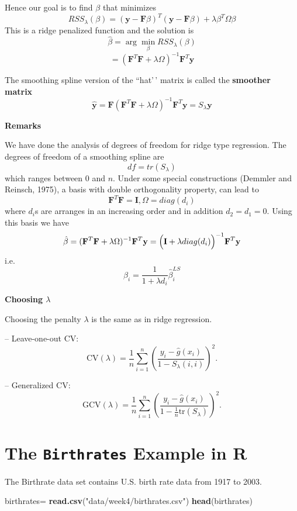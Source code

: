 \documentclass[
]{book}
\newenvironment{Shaded}{\begin{snugshade}}{\end{snugshade}}
\newcommand{\FunctionTok}[1]{\textcolor[rgb]{0.13,0.29,0.53}{\textbf{#1}}}
\newcommand{\NormalTok}[1]{#1}
\newcommand{\OtherTok}[1]{\textcolor[rgb]{0.56,0.35,0.01}{#1}}
\newcommand{\StringTok}[1]{\textcolor[rgb]{0.31,0.60,0.02}{#1}}
\begin{document}
Hence our goal is to find \(\beta\) that minimizes
\[RSS_{\lambda}(\beta) = (\mathbf{y} - \mathbf{F}\beta)^T(\mathbf{y} - \mathbf{F}\beta) + \lambda  \beta^T \Omega \beta \]
This is a ridge penalized function and the solution is
\[\hat{\beta} = \arg \min_{\beta} RSS_{\lambda}(\beta)\]
\[=(\mathbf{F}^T \mathbf{F} +\lambda \Omega)^{-1} \mathbf{F}^T \mathbf{y}\]

The smoothing spline version of the ``hat'\,' matrix is called the \textbf{smoother matrix}
\[\mathbf{\hat{y}} = \mathbf{F} (\mathbf{F}^T \mathbf{F} +\lambda \Omega)^{-1} \mathbf{F}^T \mathbf{y} = S_{\lambda} \mathbf{y}\]

\textbf{Remarks}

We have done the analysis of degrees of freedom for ridge type regression. The degrees of freedom of a smoothing spline are
\[df = tr(S_{\lambda})\]
which ranges between 0 and \(n\). Under some special constructions (Demmler and Reinsch,
1975), a basis with double orthogonality property, can lead to
\[\mathbf{F}^T \mathbf{F} = \mathbf{I}, \Omega = diag(d_i)\]
where \(d_i\)s are arranges in an increasing order and in addition \(d_2=d_1=0\). Using this basis we have
\[\hat{\beta} = (\mathbf{F}^T \mathbf{F} +\lambda \Omega)^{-1} \mathbf{F}^T \mathbf{y} = \Bigl(\mathbf{I} + \lambda diag(d_i) \Bigr)^{-1} \mathbf{F}^T \mathbf{y}\]
i.e.
\[\hat{\beta}_i = \frac{1}{1+\lambda d_i} \hat{\beta}_i^{LS}\]

\textbf{Choosing \(\lambda\)}

Choosing the penalty \(\lambda\) is the same as in ridge regression.

-- Leave-one-out CV:
\[
  \text{CV}(\lambda) = \frac{1}{n} \sum_{i=1}^n \left( \frac{y_i - \hat g(x_i)}{1 - S_\lambda(i,i)} \right)^2.
  \]

-- Generalized CV:
\[
  \text{GCV}(\lambda) = \frac{1}{n} \sum_{i=1}^n \left( \frac{y_i - \hat g(x_i)}{1 - \tfrac{1}{n}\text{tr}(S_\lambda)} \right)^2.
  \]

\section{\texorpdfstring{The \texttt{Birthrates} Example in R}{The Birthrates Example in R}}\label{the-birthrates-example-in-r}

The Birthrate data set contains U.S. birth rate data from 1917 to 2003.

\begin{Shaded}
\begin{Highlighting}[]
\NormalTok{birthrates}\OtherTok{=} \FunctionTok{read.csv}\NormalTok{(}\StringTok{"data/week4/birthrates.csv"}\NormalTok{)}
\FunctionTok{head}\NormalTok{(birthrates)}
\end{Highlighting}
\end{Shaded}
\end{document}
